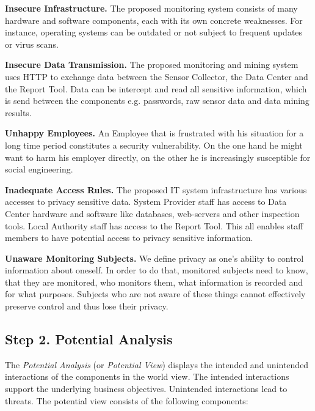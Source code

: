\documentclass[runningheads,a4paper]{llncs}
\begin{document}
\textbf{Insecure Infrastructure.}
The proposed monitoring system consists of many hardware and software components, each with its own concrete weaknesses. For instance, operating systems can be outdated or not subject to frequent updates or virus scans.

\textbf{Insecure Data Transmission.}
The proposed monitoring and mining system uses HTTP to exchange data between the Sensor Collector, the Data Center and the Report Tool.
Data can be intercept and read all sensitive information, which is send between the components e.g. passwords, raw sensor data and data mining results.

\textbf{Unhappy Employees.}
An Employee that is frustrated with his situation for a long time
period constitutes a security vulnerability. On the one hand he might
want to harm his employer directly, on the other he is increasingly
susceptible for social engineering.

\textbf{Inadequate Access Rules.}
The proposed IT system infrastructure has various accesses to privacy sensitive data.
System Provider staff has access to Data Center hardware and software like databases, web-servers and other inspection tools. Local Authority staff has access to the Report Tool. This all enables staff members to have potential access to privacy sensitive information.


\textbf{Unaware Monitoring Subjects.}
We define privacy as one's ability to control information about
oneself.  In order to do that, monitored subjects need to know, that
they are monitored, who monitors them, what information is recorded
and for what purposes.  Subjects who are not aware of these things
cannot effectively preserve control and thus lose their privacy. 

\subsection{Step 2. Potential Analysis}
\label{subsec:pot-analysis}

The \emph{Potential Analysis} (or \emph{Potential View}) displays the intended and unintended interactions of the components in the world view.
The intended interactions support the underlying business objectives.
Unintended interactions lead to threats. The potential view consists of the following components:
\end{document}
